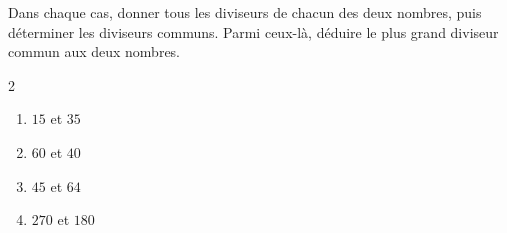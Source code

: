 \begin{exo}{}
	Dans chaque cas, donner tous les diviseurs de chacun des deux nombres, puis déterminer les diviseurs communs. Parmi ceux-là, déduire le plus grand diviseur commun aux deux nombres.
	\vspace*{-2mm}\begin{multicols}{2}
		\begin{enumerate}
			\item $15$ et $35$
			\item $60$ et $40$
			\item $45$ et $64$
			\item $270$ et $180$
		\end{enumerate}
	\end{multicols}
\end{exo}
